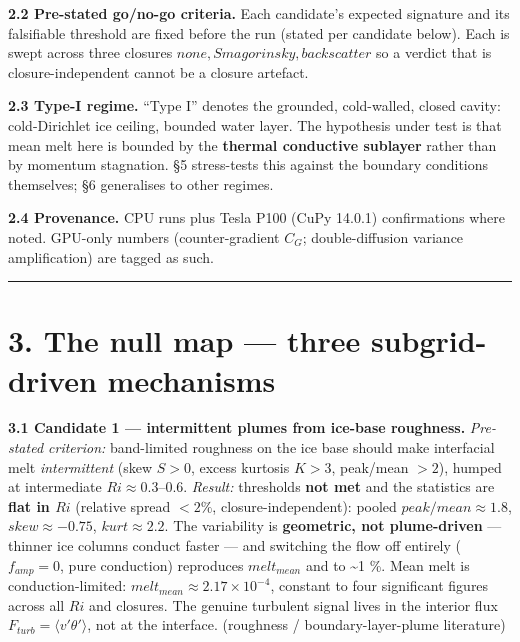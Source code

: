 \documentclass[11pt]{article}
\begin{document}
\textbf{2.2 Pre-stated go/no-go criteria.} Each candidate's expected signature and its falsifiable threshold are fixed before the run (stated per candidate below). Each is swept across three closures ${none, Smagorinsky, backscatter}$ so a verdict that is closure-independent cannot be a closure artefact.


\textbf{2.3 Type-I regime.} ``Type I'' denotes the grounded, cold-walled, closed cavity: cold-Dirichlet ice ceiling, bounded water layer. The hypothesis under test is that mean melt here is bounded by the \textbf{thermal conductive sublayer} rather than by momentum stagnation. §5 stress-tests this against the boundary conditions themselves; §6 generalises to other regimes.


\textbf{2.4 Provenance.} CPU runs plus Tesla P100 (CuPy 14.0.1) confirmations where noted. GPU-only numbers (counter-gradient $C_{G}$; double-diffusion variance amplification) are tagged as such.


\medskip\hrule\medskip


\section*{3. The null map — three subgrid-driven mechanisms}


\textbf{3.1 Candidate 1 — intermittent plumes from ice-base roughness.} \emph{Pre-stated criterion:} band-limited roughness on the ice base should make interfacial melt \emph{intermittent} (skew $S>0$, excess kurtosis $K>3$, peak/mean $>2$), humped at intermediate $Ri\approx 0.3–0.6$. \emph{Result:} thresholds \textbf{not met} and the statistics are \textbf{flat in $Ri$} (relative spread $<2\%$, closure-independent): pooled $peak/mean\approx 1.8$, $skew\approx -0.75$, $kurt\approx 2.2$. The variability is \textbf{geometric, not plume-driven} — thinner ice columns conduct faster — and switching the flow off entirely ($f_{amp}=0$, pure conduction) reproduces $melt_{mean}$ and  to \textasciitilde{}1 \%. Mean melt is conduction-limited: $melt_{mean}\approx 2.17\times 10^{-4}$, constant to four significant figures across all $Ri$ and closures. The genuine turbulent signal lives in the interior flux $F_{turb}=\langle v'\theta '\rangle $, not at the interface. (roughness / boundary-layer-plume literature)
\end{document}
